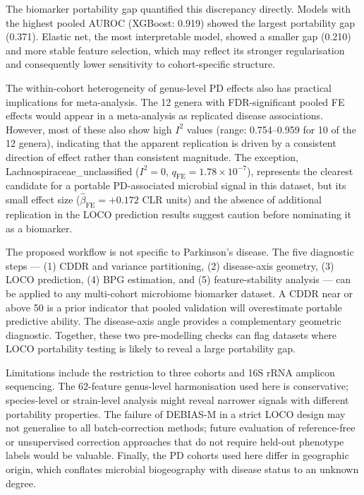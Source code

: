 \documentclass[12pt,a4paper]{article}
\begin{document}
The biomarker portability gap quantified this discrepancy directly. Models
with the highest pooled AUROC (XGBoost: 0.919) showed the largest portability
gap (0.371). Elastic net, the most interpretable model, showed a smaller gap
(0.210) and more stable feature selection, which may reflect its stronger
regularisation and consequently lower sensitivity to cohort-specific
structure.

The within-cohort heterogeneity of genus-level PD effects also has practical
implications for meta-analysis. The 12 genera with FDR-significant pooled FE
effects would appear in a meta-analysis as replicated disease associations.
However, most of these also show high $I^2$ values (range: 0.754--0.959 for
10 of the 12 genera), indicating that the apparent replication is driven by a
consistent direction of effect rather than consistent magnitude. The exception,
Lachnospiraceae\_unclassified ($I^2 = 0$, $q_{\mathrm{FE}} = 1.78 \times
10^{-7}$), represents the clearest candidate for a portable PD-associated
microbial signal in this dataset, but its small effect size
($\hat\beta_{\mathrm{FE}} = +0.172$ CLR units) and the absence of additional
replication in the LOCO prediction results suggest caution before nominating
it as a biomarker.

The proposed workflow is not specific to Parkinson's disease. The five
diagnostic steps --- (1) CDDR and variance partitioning, (2) disease-axis
geometry, (3) LOCO prediction, (4) BPG estimation, and (5) feature-stability
analysis --- can be applied to any multi-cohort microbiome biomarker dataset.
A CDDR near or above 50 is a prior indicator that pooled validation will
overestimate portable predictive ability. The disease-axis angle provides a
complementary geometric diagnostic. Together, these two pre-modelling checks
can flag datasets where LOCO portability testing is likely to reveal a large
portability gap.

Limitations include the restriction to three cohorts and 16S rRNA amplicon
sequencing. The 62-feature genus-level harmonisation used here is
conservative; species-level or strain-level analysis might reveal narrower
signals with different portability properties. The failure of DEBIAS-M in a
strict LOCO design may not generalise to all batch-correction methods; future
evaluation of reference-free or unsupervised correction approaches that do
not require held-out phenotype labels would be valuable. Finally, the PD
cohorts used here differ in geographic origin, which conflates microbial
biogeography with disease status to an unknown degree.
\end{document}
